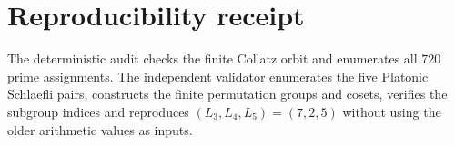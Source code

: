 \section{Reproducibility receipt}

The deterministic audit
checks the finite Collatz orbit and enumerates all \(720\) prime assignments.
The independent validator
enumerates the five Platonic Schlaefli pairs, constructs the finite permutation
groups and cosets, verifies the subgroup indices and reproduces
\((L_3,L_4,L_5)=(7,2,5)\) without using the older arithmetic values as inputs.
